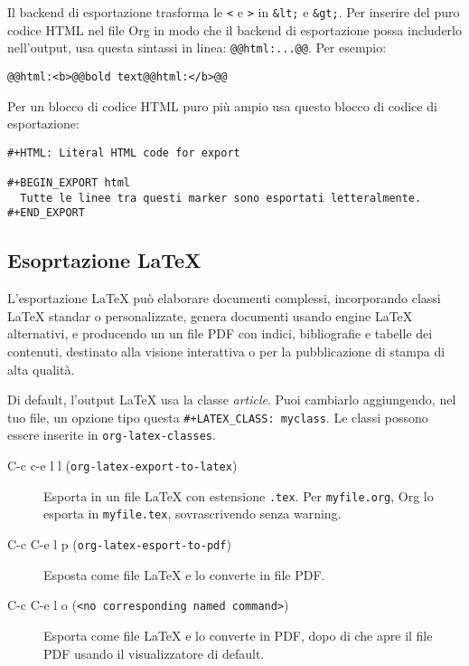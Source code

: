 \documentclass[11pt]{article}
\begin{document}
Il backend di esportazione trasforma le \texttt{<} e \texttt{>} in \texttt{\&lt;} e \texttt{\&gt;}.
Per inserire del puro codice HTML nel file Org in modo che il backend
di esportazione possa includerlo nell'output, usa questa sintassi in
linea: \texttt{@@html:...@@}. Per esempio:

\begin{verbatim}
@@html:<b>@@bold text@@html:</b>@@
\end{verbatim}


Per un blocco di codice HTML puro più ampio usa questo blocco di
codice di esportazione:

\begin{verbatim}
#+HTML: Literal HTML code for export

#+BEGIN_EXPORT html
  Tutte le linee tra questi marker sono esportati letteralmente.
#+END_EXPORT
\end{verbatim}

\subsection{Esoprtazione \LaTeX{}}
\label{sec:org0dd162a}
L'esportazione \LaTeX{} può elaborare documenti complessi, incorporando
classi \LaTeX{} standar o personalizzate, genera documenti usando engine
\LaTeX{} alternativi, e producendo un un file PDF con indici,
bibliografie e tabelle dei contenuti, destinato alla visione
interattiva o per la pubblicazione di stampa di alta qualità.

Di default, l'output \LaTeX{} usa la classe \emph{article}. Puoi cambiarlo
aggiungendo, nel tuo file, un opzione tipo questa \texttt{\#+LATEX\_CLASS:
myclass}. Le classi possono essere inserite in \texttt{org-latex-classes}.

\begin{description}
\item[{C-c c-e l l (\texttt{org-latex-export-to-latex})}] Esporta in un file \LaTeX{} con estensione \texttt{.tex}. Per \texttt{myfile.org},
Org lo esporta in \texttt{myfile.tex}, sovrascrivendo senza warning.

\item[{C-c C-e l p (\texttt{org-latex-esport-to-pdf})}] Esposta come file \LaTeX{} e lo converte in file PDF.

\item[{C-c C-e l o (\texttt{<no corresponding named command>})}] Esporta come file \LaTeX{} e lo converte in PDF, dopo di che apre il
file PDF usando il visualizzatore di default.
\end{description}
\end{document}
